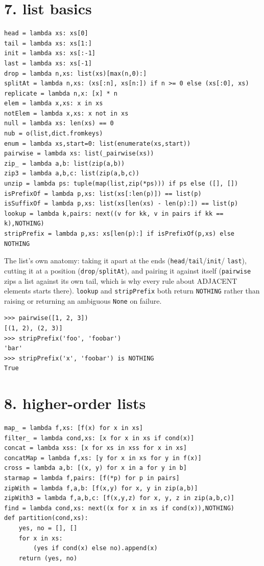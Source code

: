 \documentclass[10pt,letterpaper]{book}
\begin{document}
\section*{7. list basics}
\begin{lstlisting}[style=code]
head = lambda xs: xs[0]
tail = lambda xs: xs[1:]
init = lambda xs: xs[:-1]
last = lambda xs: xs[-1]
drop = lambda n,xs: list(xs)[max(n,0):]
splitAt = lambda n,xs: (xs[:n], xs[n:]) if n >= 0 else (xs[:0], xs)
replicate = lambda n,x: [x] * n
elem = lambda x,xs: x in xs
notElem = lambda x,xs: x not in xs
null = lambda xs: len(xs) == 0
nub = o(list,dict.fromkeys)
enum = lambda xs,start=0: list(enumerate(xs,start))
pairwise = lambda xs: list(_pairwise(xs))
zip_ = lambda a,b: list(zip(a,b))
zip3 = lambda a,b,c: list(zip(a,b,c))
unzip = lambda ps: tuple(map(list,zip(*ps))) if ps else ([], [])
isPrefixOf = lambda p,xs: list(xs[:len(p)]) == list(p)
isSuffixOf = lambda p,xs: list(xs[len(xs) - len(p):]) == list(p)
lookup = lambda k,pairs: next((v for kk, v in pairs if kk == k),NOTHING)
stripPrefix = lambda p,xs: xs[len(p):] if isPrefixOf(p,xs) else NOTHING
\end{lstlisting}

The list's own anatomy: taking it apart at the ends (\texttt{head}/\texttt{tail}/\texttt{init}/
\texttt{last}), cutting it at a position (\texttt{drop}/\texttt{splitAt}), and pairing it against
itself (\texttt{pairwise} zips a list against its own tail, which is why every rule about ADJACENT
elements starts there). \texttt{lookup} and \texttt{stripPrefix} both return \texttt{NOTHING} rather
than raising or returning an ambiguous \texttt{None} on failure.
\begin{lstlisting}[style=ex]
>>> pairwise([1, 2, 3])
[(1, 2), (2, 3)]
>>> stripPrefix('foo', 'foobar')
'bar'
>>> stripPrefix('x', 'foobar') is NOTHING
True
\end{lstlisting}
\section*{8. higher-order lists}
\begin{lstlisting}[style=code]
map_ = lambda f,xs: [f(x) for x in xs]
filter_ = lambda cond,xs: [x for x in xs if cond(x)]
concat = lambda xss: [x for xs in xss for x in xs]
concatMap = lambda f,xs: [y for x in xs for y in f(x)]
cross = lambda a,b: [(x, y) for x in a for y in b]
starmap = lambda f,pairs: [f(*p) for p in pairs]
zipWith = lambda f,a,b: [f(x,y) for x, y in zip(a,b)]
zipWith3 = lambda f,a,b,c: [f(x,y,z) for x, y, z in zip(a,b,c)]
find = lambda cond,xs: next((x for x in xs if cond(x)),NOTHING)
def partition(cond,xs):
    yes, no = [], []
    for x in xs:
        (yes if cond(x) else no).append(x)
    return (yes, no)
\end{lstlisting}
\end{document}
